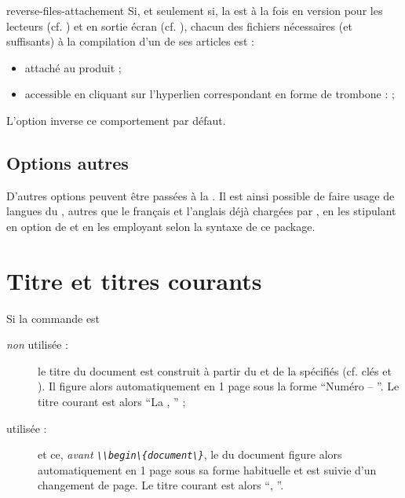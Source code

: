 \documentclass{letgut}
\begin{document}
\begin{docKey}{reverse-files-attachement}{}{}
  Si, et seulement si, la  est à la fois en version pour les lecteurs
  (cf. ) et en sortie écran (cf. ), chacun
  des fichiers nécessaires (et suffisants) à la compilation d'un de ses articles
  est :
  \begin{itemize}
  \item attaché au \pdf{} produit ;
  \item accessible en cliquant sur l'hyperlien correspondant en forme de
    trombone : \noattachfile[icon=Paperclip] ;
  \end{itemize}
  L'option  inverse ce comportement par
  défaut.
\end{docKey}

\subsection{Options autres}
\label{sec:options-autres}

D'autres options peuvent être passées à la . Il est ainsi possible
de faire usage de langues du , autres que le français et
l'anglais déjà chargées par , en les stipulant en option de
 et en les employant selon la syntaxe de ce
package.

\section{Titre et titres courants}
\label{sec:titre}
Si la commande  est
\begin{description}
\item[\emph{non} utilisée :] le titre du document est construit à partir du
   et de la  spécifiés (cf. clés  et
  ). Il figure alors automatiquement en 1\iere{} page sous la forme
  \enquote{Numéro  -- }. Le titre courant est alors
  \enquote{La , } ;
\item[ utilisée\footnotemark{} :]  et
  ce, \emph{avant \lstinline+\\begin\{document\}+}, le  du document
  figure alors automatiquement en 1\iere{} page sous sa forme habituelle et est
  suivie d'un changement de page. Le titre courant est alors
  \enquote{, }.
\end{description}
\end{document}
